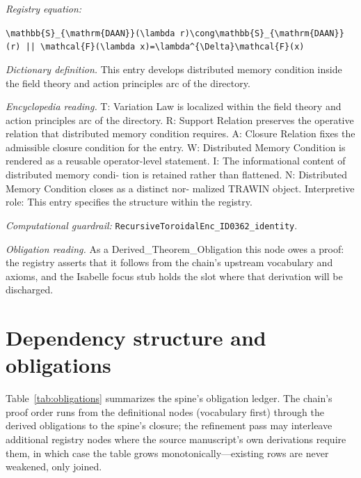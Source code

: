 \documentclass[11pt]{article}
\theoremstyle{remark}
\begin{document}
\noindent\textit{Registry equation:}\par
{\small\texttt{\textbackslash{}mathbb\{S\}\_\{\textbackslash{}mathrm\{DAAN\}\}(\textbackslash{}lambda r)\textbackslash{}cong\textbackslash{}mathbb\{S\}\_\{\textbackslash{}mathrm\{DAAN\}\}(r) || \textbackslash{}mathcal\{F\}(\textbackslash{}lambda x)=\textbackslash{}lambda\textasciicircum{}\{\textbackslash{}Delta\}\textbackslash{}mathcal\{F\}(x)}}\par\medskip
\noindent\textit{Dictionary definition.} This entry develops distributed memory condition inside the field theory and action principles arc of the directory.\par\medskip
\noindent\textit{Encyclopedia reading.} T: Variation Law is localized within the field theory and action principles arc of the directory. R: Support Relation preserves the operative relation that distributed memory condition requires. A: Closure Relation fixes the admissible closure condition for the entry. W: Distributed Memory Condition is rendered as a reusable operator-level statement. I: The informational content of distributed memory condi- tion is retained rather than flattened. N: Distributed Memory Condition closes as a distinct nor- malized TRAWIN object. Interpretive role: This entry specifies the structure within the registry.
\par\medskip\noindent\textit{Computational guardrail:} \texttt{RecursiveToroidalEnc\_ID0362\_identity}.
\par\medskip\noindent\textit{Obligation reading.} As a Derived\_Theorem\_Obligation this node owes a proof: the registry asserts that it follows from the chain's upstream vocabulary and axioms, and the Isabelle focus stub holds the slot where that derivation will be discharged.

\section{Dependency structure and obligations}
\label{sec:dep}

Table~\ref{tab:obligations} summarizes the spine's obligation ledger. The chain's proof order runs from the definitional nodes (vocabulary first) through the derived obligations to the spine's closure; the refinement pass may interleave additional registry nodes where the source manuscript's own derivations require them, in which case the table grows monotonically---existing rows are never weakened, only joined.
\end{document}
